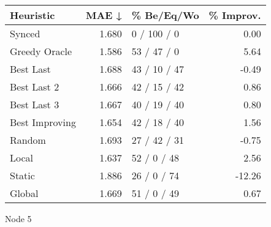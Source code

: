 \begin{tabular}{lrlr}
\toprule
\textbf{Heuristic} & \textbf{MAE ↓} & \textbf{\% Be/Eq/Wo} & \textbf{\% Improv.} \\
\midrule
            Synced &          1.680 &          0 / 100 / 0 &                0.00 \\
     Greedy Oracle &          1.586 &          53 / 47 / 0 &                5.64 \\
         Best Last &          1.688 &         43 / 10 / 47 &               -0.49 \\
       Best Last 2 &          1.666 &         42 / 15 / 42 &                0.86 \\
       Best Last 3 &          1.667 &         40 / 19 / 40 &                0.80 \\
    Best Improving &          1.654 &         42 / 18 / 40 &                1.56 \\
            Random &          1.693 &         27 / 42 / 31 &               -0.75 \\
             Local &          1.637 &          52 / 0 / 48 &                2.56 \\
            Static &          1.886 &          26 / 0 / 74 &              -12.26 \\
            Global &          1.669 &          51 / 0 / 49 &                0.67 \\
\bottomrule
\end{tabular}
\caption{Node 5}
\label{tab:ds_non_lr05_le2_bs2_5}
